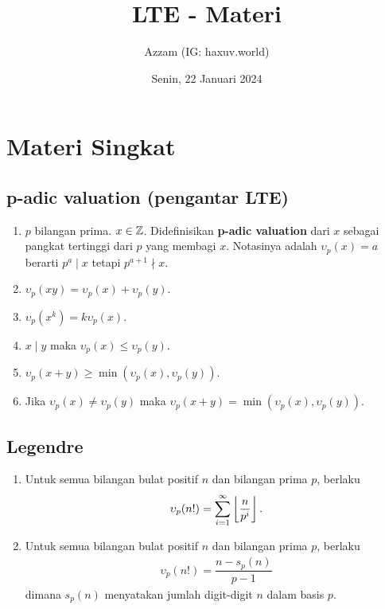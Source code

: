 \documentclass[11pt]{scrartcl}
\title{LTE - Materi}
\author{Azzam (IG: haxuv.world)}
\date{Senin, 22 Januari 2024}
\begin{document}
\maketitle

\section{Materi Singkat}
\subsection{p-adic valuation (pengantar LTE)}
\begin{enumerate}
    \item $p$ bilangan prima. $x \in \mathbb Z$. Didefinisikan \textbf{p-adic valuation} dari $x$ sebagai pangkat tertinggi dari $p$ yang membagi $x$. Notasinya adalah $\upsilon_p(x)=a$ berarti $p^a \mid x$ tetapi $p^{a+1} \nmid x$.
    \item $\upsilon_p(xy) = \upsilon_p(x) + \upsilon_p(y)$.
    \item $\upsilon_p(x^k)=k\upsilon_p(x)$.
    \item $x \mid y$ maka $\upsilon_p(x) \le \upsilon_p(y)$.
    \item $\upsilon_p(x+y) \ge \min(\upsilon_p(x),\upsilon_p(y))$.
    \item Jika $\upsilon_p(x) \neq \upsilon_p(y)$ maka $\upsilon_p(x+y) = \min(\upsilon_p(x),\upsilon_p(y))$.
\end{enumerate}

\subsection{Legendre}
\begin{enumerate}
    \item Untuk semua bilangan bulat positif $n$ dan bilangan prima $p$, berlaku
\begin{align*}
    \upsilon_p(n!) = \sum_{i=1}^{\infty} \left\lfloor \frac{n}{p^i} \right\rfloor.
\end{align*}

    \item Untuk semua bilangan bulat positif $n$ dan bilangan prima $p$, berlaku
\begin{align*}
    \upsilon_p(n!) = \dfrac{n-s_p(n)}{p-1}
\end{align*}
    dimana $s_p(n)$ menyatakan jumlah digit-digit $n$ dalam basis $p$.
\end{enumerate}
\end{document}
